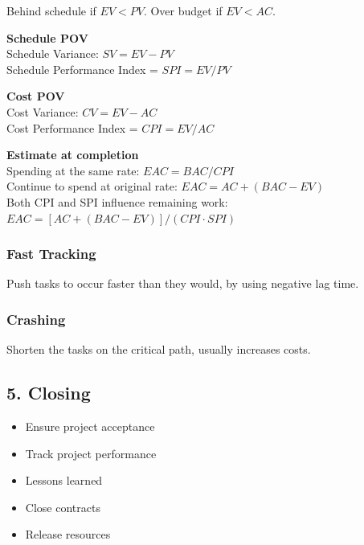 Behind schedule if $EV < PV$.
Over budget if $EV < AC$.

\textbf{Schedule POV}\\
Schedule Variance: $SV = EV - PV$\\
Schedule Performance Index = $SPI = EV/PV$

\textbf{Cost POV}\\
Cost Variance: $CV = EV - AC$\\
Cost Performance Index = $CPI = EV/AC$

\textbf{Estimate at completion}\\
Spending at the same rate: $EAC = BAC/CPI$\\
Continue to spend at original rate: $EAC = AC + (BAC - EV)$\\
Both CPI and SPI influence remaining work: $EAC = [AC + (BAC - EV)] / (CPI \cdot SPI)$

\subsubsection{Fast Tracking}
Push tasks to occur faster than they would, by using negative lag time.

\subsubsection{Crashing}
Shorten the tasks on the critical path, usually increases costs.

\subsection{5. Closing}
\begin{itemize}
    \item Ensure project acceptance
    \item Track project performance
    \item Lessons learned
    \item Close contracts
    \item Release resources
\end{itemize}